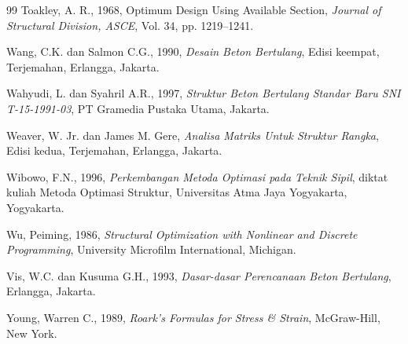 \begin{thebibliography}{99}
 Toakley, A. R., 1968, Optimum Design Using Available Section, \textit{Journal of Structural Division, ASCE}, Vol. 34, pp. 1219--1241.

 Wang, C.K. dan Salmon C.G., 1990, \textit{Desain Beton Bertulang}, Edisi keempat, Terjemahan, Erlangga, Jakarta.

 Wahyudi, L. dan Syahril A.R., 1997, \textit{Struktur Beton Bertulang Standar Baru SNI T-15-1991-03}, PT Gramedia Pustaka Utama, Jakarta.

 Weaver, W. Jr. dan James M. Gere, \textit{Analisa Matriks Untuk Struktur Rangka}, Edisi kedua, Terjemahan, Erlangga, Jakarta.

 Wibowo, F.N., 1996, \textit{Perkembangan Metoda Optimasi pada Teknik Sipil}, diktat kuliah Metoda Optimasi Struktur, Universitas Atma Jaya Yogyakarta, Yogyakarta.

 Wu, Peiming, 1986, \textit{Structural Optimization with Nonlinear and Discrete Programming}, University Microfilm International, Michigan.

 Vis, W.C. dan Kusuma G.H., 1993, \textit{Dasar-dasar Perencanaan Beton Bertulang}, Erlangga, Jakarta.

 Young, Warren C., 1989, \textit{Roark's Formulas for Stress \& Strain}, McGraw-Hill, New York.

\end{thebibliography}
